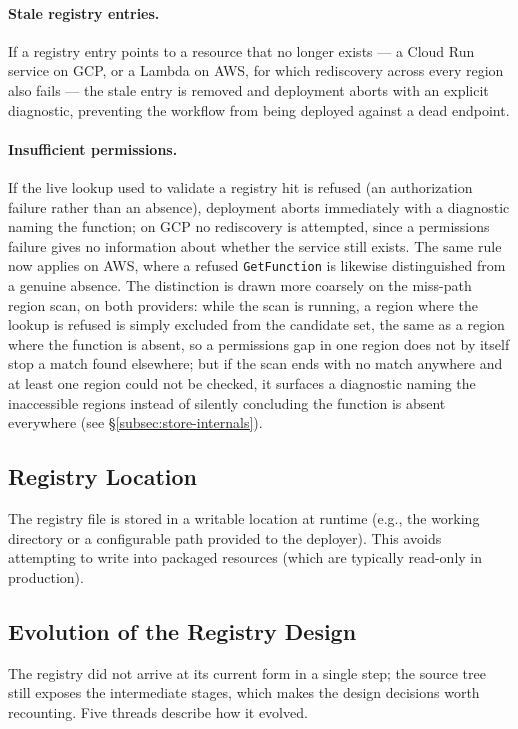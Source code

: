 \paragraph{Stale registry entries.}
If a registry entry points to a resource that no longer exists --- a Cloud Run service on GCP, or
a Lambda on AWS, for which rediscovery across every region also fails --- the stale entry is
removed and deployment aborts with an explicit diagnostic, preventing the workflow from being
deployed against a dead endpoint.

\paragraph{Insufficient permissions.}
If the live lookup used to validate a registry hit is refused (an authorization failure rather
than an absence), deployment aborts immediately with a diagnostic naming the function; on GCP no
rediscovery is attempted, since a permissions failure gives no information about whether the
service still exists. The same rule now applies on AWS, where a refused \texttt{GetFunction} is
likewise distinguished from a genuine absence. The distinction is drawn more coarsely on the
miss-path region scan, on both providers: while the scan is running, a region where the lookup is
refused is simply excluded from the candidate set, the same as a region where the function is
absent, so a permissions gap in one region does not by itself stop a match found elsewhere; but if
the scan ends with no match anywhere and at least one region could not be checked, it surfaces a
diagnostic naming the inaccessible regions instead of silently concluding the function is absent
everywhere (see \S\ref{subsec:store-internals}).

\subsection{Registry Location}
The registry file is stored in a writable location at runtime (e.g., the working directory or a configurable path provided to the deployer). This avoids attempting to write into packaged resources (which are typically read-only in production).

\subsection{Evolution of the Registry Design}
\label{subsec:registry-evolution}

The registry did not arrive at its current form in a single step; the source tree still exposes
the intermediate stages, which makes the design decisions worth recounting. Five threads describe
how it evolved.

